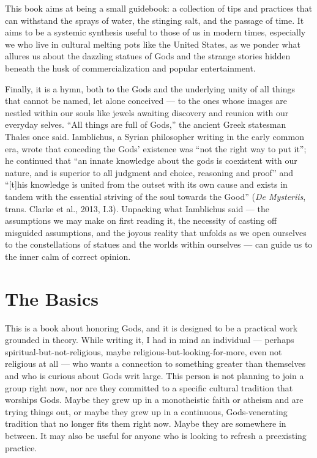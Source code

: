 \documentclass[
]{book}
\begin{document}
This book aims at being a small guidebook: a collection of tips and practices that can withstand the sprays of water, the stinging salt, and the passage of time. It aims to be a systemic synthesis useful to those of us in modern times, especially we who live in cultural melting pots like the United States, as we ponder what allures us about the dazzling statues of Gods and the strange stories hidden beneath the husk of commercialization and popular entertainment.

Finally, it is a hymn, both to the Gods and the underlying unity of all things that cannot be named, let alone conceived --- to the ones whose images are nestled within our souls like jewels awaiting discovery and reunion with our everyday selves. ``All things are full of Gods,'' the ancient Greek statesman Thales once said. Iamblichus, a Syrian philosopher writing in the early common era, wrote that conceding the Gods' existence was ``not the right way to put it''; he continued that ``an innate knowledge about the gods is coexistent with our nature, and is superior to all judgment and choice, reasoning and proof'' and ``{[}t{]}his knowledge is united from the outset with its own cause and exists in tandem with the essential striving of the soul towards the Good'' (\emph{De Mysteriis}, trans. Clarke et al., 2013, I.3). Unpacking what Iamblichus said --- the assumptions we may make on first reading it, the necessity of casting off misguided assumptions, and the joyous reality that unfolds as we open ourselves to the constellations of statues and the worlds within ourselves --- can guide us to the inner calm of correct opinion.

\hypertarget{the-basics}{%
\section{The Basics}\label{the-basics}}

This is a book about honoring Gods, and it is designed to be a practical work grounded in theory. While writing it, I had in mind an individual --- perhaps spiritual-but-not-religious, maybe religious-but-looking-for-more, even not religious at all --- who wants a connection to something greater than themselves and who is curious about Gods writ large. This person is not planning to join a group right now, nor are they committed to a specific cultural tradition that worships Gods. Maybe they grew up in a monotheistic faith or atheism and are trying things out, or maybe they grew up in a continuous, Gods-venerating tradition that no longer fits them right now. Maybe they are somewhere in between. It may also be useful for anyone who is looking to refresh a preexisting practice.
\end{document}
